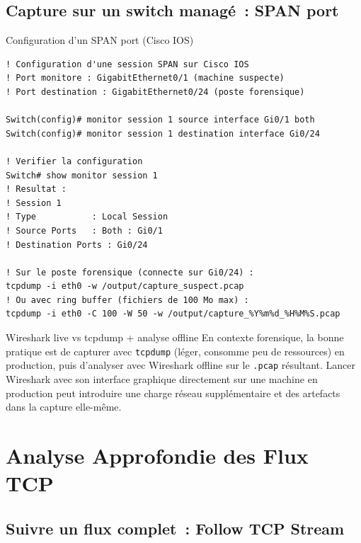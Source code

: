 \subsection{Capture sur un switch managé~: SPAN port}

\begin{boxoutils}{Configuration d'un SPAN port (Cisco IOS)}
\begin{lstlisting}[language=bash_forensique]
! Configuration d'une session SPAN sur Cisco IOS
! Port monitore : GigabitEthernet0/1 (machine suspecte)
! Port destination : GigabitEthernet0/24 (poste forensique)

Switch(config)# monitor session 1 source interface Gi0/1 both
Switch(config)# monitor session 1 destination interface Gi0/24

! Verifier la configuration
Switch# show monitor session 1
! Resultat :
! Session 1
! Type           : Local Session
! Source Ports   : Both : Gi0/1
! Destination Ports : Gi0/24

! Sur le poste forensique (connecte sur Gi0/24) :
tcpdump -i eth0 -w /output/capture_suspect.pcap
! Ou avec ring buffer (fichiers de 100 Mo max) :
tcpdump -i eth0 -C 100 -W 50 -w /output/capture_%Y%m%d_%H%M%S.pcap
\end{lstlisting}
\end{boxoutils}

\begin{boiteRemarque}{Wireshark live vs tcpdump + analyse offline}
En contexte forensique, la bonne pratique est de capturer avec
\texttt{tcpdump} (léger, consomme peu de ressources) en production,
puis d'analyser avec Wireshark offline sur le \texttt{.pcap} résultant.
Lancer Wireshark avec son interface graphique directement sur une
machine en production peut introduire une charge réseau supplémentaire
et des artefacts dans la capture elle-même.
\end{boiteRemarque}

\section{Analyse Approfondie des Flux TCP}
\label{sec:analyse-flux}

\subsection{Suivre un flux complet~: Follow TCP Stream}

